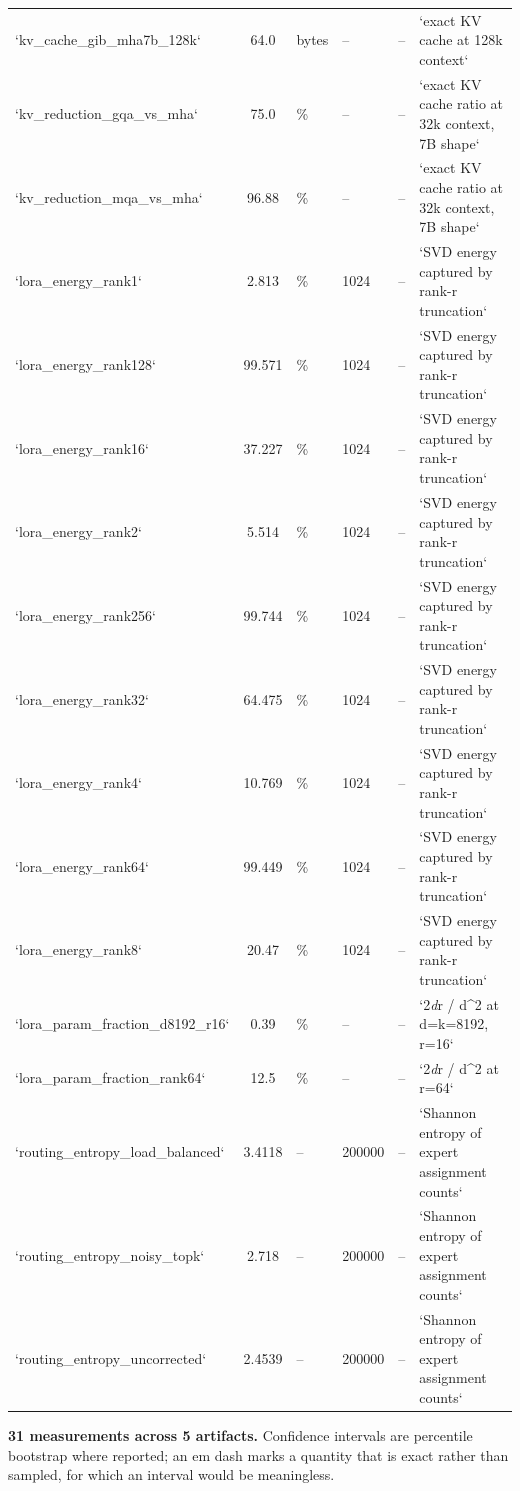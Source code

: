 \documentclass[10pt,twocolumn,letterpaper]{article}
\begin{document}
\begin{table}[htbp]
{\begin{tabular}{lcllll}
`kv\_cache\_gib\_mha7b\_128k` & 64.0 & bytes & -- & -- & `exact KV cache at 128k context` \\
`kv\_reduction\_gqa\_vs\_mha` & 75.0 & \% & -- & -- & `exact KV cache ratio at 32k context, 7B shape` \\
`kv\_reduction\_mqa\_vs\_mha` & 96.88 & \% & -- & -- & `exact KV cache ratio at 32k context, 7B shape` \\
`lora\_energy\_rank1` & 2.813 & \% & 1024 & -- & `SVD energy captured by rank-r truncation` \\
`lora\_energy\_rank128` & 99.571 & \% & 1024 & -- & `SVD energy captured by rank-r truncation` \\
`lora\_energy\_rank16` & 37.227 & \% & 1024 & -- & `SVD energy captured by rank-r truncation` \\
`lora\_energy\_rank2` & 5.514 & \% & 1024 & -- & `SVD energy captured by rank-r truncation` \\
`lora\_energy\_rank256` & 99.744 & \% & 1024 & -- & `SVD energy captured by rank-r truncation` \\
`lora\_energy\_rank32` & 64.475 & \% & 1024 & -- & `SVD energy captured by rank-r truncation` \\
`lora\_energy\_rank4` & 10.769 & \% & 1024 & -- & `SVD energy captured by rank-r truncation` \\
`lora\_energy\_rank64` & 99.449 & \% & 1024 & -- & `SVD energy captured by rank-r truncation` \\
`lora\_energy\_rank8` & 20.47 & \% & 1024 & -- & `SVD energy captured by rank-r truncation` \\
`lora\_param\_fraction\_d8192\_r16` & 0.39 & \% & -- & -- & `2\textit{d}r / d^2 at d=k=8192, r=16` \\
`lora\_param\_fraction\_rank64` & 12.5 & \% & -- & -- & `2\textit{d}r / d^2 at r=64` \\
`routing\_entropy\_load\_balanced` & 3.4118 & -- & 200000 & -- & `Shannon entropy of expert assignment counts` \\
`routing\_entropy\_noisy\_topk` & 2.718 & -- & 200000 & -- & `Shannon entropy of expert assignment counts` \\
`routing\_entropy\_uncorrected` & 2.4539 & -- & 200000 & -- & `Shannon entropy of expert assignment counts` \\
\bottomrule
\end{tabular}}
\end{table}

\textbf{31 measurements across 5 artifacts.} Confidence intervals are percentile bootstrap where reported; an em dash marks a quantity that is exact rather than sampled, for which an interval would be meaningless.
\end{document}
